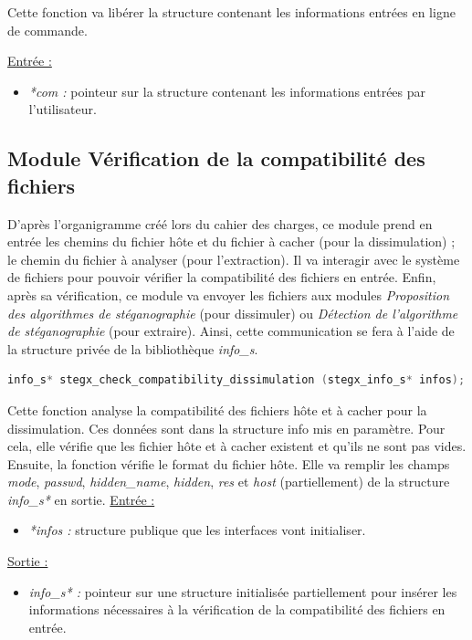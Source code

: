 \documentclass[11pt]{article}
\begin{document}
Cette fonction va libérer la structure contenant les informations entrées 
en ligne de commande. \newline

\underline{Entrée :} 
\begin{itemize}
\item \textit{*com :} pointeur sur la structure contenant les informations 
entrées par l'utilisateur. 
\newline 
\end{itemize}

\subsection{Module Vérification de la compatibilité des fichiers}

D'après l'organigramme créé lors du cahier des charges, ce module prend en 
entrée les chemins du fichier hôte et du fichier à cacher (pour la dissimulation) ; 
le chemin du fichier à analyser (pour l'extraction). Il va interagir avec 
le système de fichiers pour pouvoir vérifier la compatibilité des fichiers en entrée. 
Enfin, après sa vérification, ce module va envoyer les fichiers aux modules 
\textit{Proposition des algorithmes de stéganographie} (pour dissimuler) ou 
\textit{Détection de l'algorithme de stéganographie} (pour extraire). 
Ainsi, cette communication se fera à l'aide de la structure privée de la 
bibliothèque \textit{info\_s}. 
\newline

\begin{lstlisting}[language=c]
info_s* stegx_check_compatibility_dissimulation (stegx_info_s* infos);
\end{lstlisting}

Cette fonction analyse la compatibilité des fichiers hôte et à cacher pour
la dissimulation. Ces données sont dans la structure info mis en paramètre. 
Pour cela, elle vérifie que les fichier hôte et à cacher existent et qu'ils 
ne sont pas vides. Ensuite, la fonction vérifie le format du fichier hôte. 
Elle va remplir les champs \textit{mode}, \textit{passwd}, \textit{hidden\_name}, \textit{hidden},
\textit{res} et \textit{host} (partiellement) de la structure
\textit{info\_s*} en sortie. 
\newline
\underline{Entrée :}
\begin{itemize}
\item \textit{*infos :} structure publique que les interfaces vont initialiser.
\end{itemize}
\underline{Sortie :}
\begin{itemize}
\item \textit{info\_s* :} pointeur sur une structure initialisée 
partiellement pour insérer les informations nécessaires à la vérification 
de la compatibilité des fichiers en entrée. 
\newline 
\end{itemize}
\end{document}
